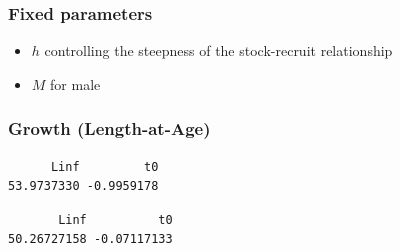 \documentclass[11pt,
  english,
  a4paper,
]{article}
\begin{document}

\hypertarget{fixed-parameters}{%
\subsubsection{Fixed parameters}\label{fixed-parameters}}

\leavevmode\tagmcend\tagstructend


\begin{itemize}
\item

  {\(h\)\leavevmode\tagmcend\tagstructend} controlling the steepness of the stock-recruit relationship

  \tagmcend\tagstructend\tagstructend
\item

  {\(M\)\leavevmode\tagmcend\tagstructend} for male

  \tagmcend\tagstructend\tagstructend
\end{itemize}

\tagstructend


\hypertarget{growth-length-at-age}{%
\subsubsection{Growth (Length-at-Age)}\label{growth-length-at-age}}

\leavevmode\tagmcend\tagstructend


\begin{verbatim}
      Linf         t0 
53.9737330 -0.9959178 
\end{verbatim}

\leavevmode\tagmcend\tagstructend


\begin{verbatim}
       Linf          t0 
50.26727158 -0.07117133 
\end{verbatim}

\leavevmode\tagmcend\tagstructend
\end{document}
